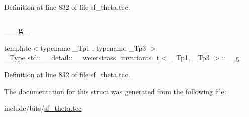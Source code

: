 Definition at line 832 of file sf\+\_\+theta.\+tcc.

\mbox{\label{structstd_1_1____detail_1_1____weierstrass__invariants__t_a585d9c21b0b189782b58f121cd101289}} 
\subsubsection{\texorpdfstring{\+\_\+\+\_\+g\+\_}{\_\_g\_3}}
{\footnotesize\ttfamily template$<$typename \+\_\+\+Tp1 , typename \+\_\+\+Tp3 $>$ \\
\hyperlink{structstd_1_1____detail_1_1____weierstrass__invariants__t_a9992ab3f07a514203487c0760d76173f}{\+\_\+\+Type} \hyperlink{structstd_1_1____detail_1_1____weierstrass__invariants__t}{std\+::\+\_\+\+\_\+detail\+::\+\_\+\+\_\+weierstrass\+\_\+invariants\+\_\+t}$<$ \+\_\+\+Tp1, \+\_\+\+Tp3 $>$\+::\+\_\+\+\_\+g\+\_}



Definition at line 832 of file sf\+\_\+theta.\+tcc.



The documentation for this struct was generated from the following file\+:\begin{DoxyCompactItemize}
\item 
include/bits/\hyperlink{sf__theta_8tcc}{sf\+\_\+theta.\+tcc}\end{DoxyCompactItemize}
